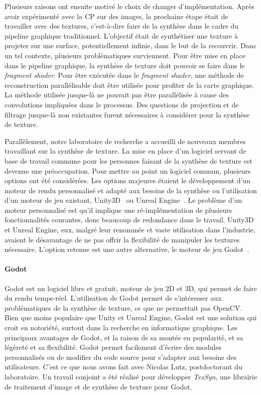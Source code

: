\bigskip

Plusieurs raisons ont ensuite motivé le choix de changer d'implémentation. Après avoir expérimenté avec la CP sur des images, la prochaine étape était de travailler avec des textures, c'est-à-dire faire de la synthèse dans le cadre du pipeline graphique traditionnel. L'objectif était de synthétiser une texture à projeter sur une surface, potentiellement infinie, dans le but de la recouvrir. Dans un tel contexte, plusieurs problématiques surviennent. Pour être mise en place dans le pipeline graphique, la synthèse de texture doit pouvoir se faire dans le \textit{fragment shader}. Pour être exécutée dans le \textit{fragment shader}, une méthode de reconstruction parallélisable doit être utilisée pour profiter de la carte graphique. La méthode utilisée jusque-là ne pouvait pas être parallélisée à cause des convolutions impliquées dans le processus. Des questions de projection et de filtrage jusque-là non existantes furent nécessaires à considérer pour la synthèse de texture.

\bigskip

Parallèlement, notre laboratoire de recherche a accueilli de nouveaux membres travaillant sur la synthèse de texture. La mise en place d'un logiciel servant de base de travail commune pour les personnes faisant de la synthèse de texture est devenue une préoccupation. Pour mettre au point un logiciel commun, plusieurs options ont été considérées. Les options majeures étaient le développement d'un moteur de rendu personnalisé et adapté aux besoins de la synthèse ou l'utilisation d'un moteur de jeu existant, Unity3D~\cite{unity_engine} ou Unreal Engine~\cite{unreal_engine}. Le problème d'un moteur personnalisé est qu'il implique une ré-implémentation de plusieurs fonctionnalités courantes, donc beaucoup de redondance dans le travail. Unity3D et Unreal Engine, eux, malgré leur renommée et vaste utilisation dans l'industrie, avaient le désavantage de ne pas offrir la flexibilité de manipuler les textures nécessaire. L'option retenue est une autre alternative, le moteur de jeu Godot~\cite{godot_game_engine}.

\paragraph{Godot}

Godot est un logiciel libre et gratuit, moteur de jeu 2D et 3D, qui permet de faire du rendu temps-réel. L'utilisation de Godot permet de s'intéresser aux problématiques de la synthèse de texture, ce que ne permettait pas OpenCV. Bien que moins populaire que Unity et Unreal Engine, Godot est une solution qui croit en notoriété, surtout dans la recherche en informatique graphique. Les principaux avantages de Godot, et la raison de sa montée en popularité, et sa légèreté et sa flexibilité. Godot permet facilement d'écrire des modules personnalisés ou de modifier du code source pour s'adapter aux besoins des utilisateurs. C'est ce que nous avons fait avec Nicolas Lutz, postdoctorant du laboratoire. Un travail conjoint a été réalisé pour développer \textit{TexSyn}, une librairie \cpp de traitement d'image et de synthèse de texture pour Godot.

